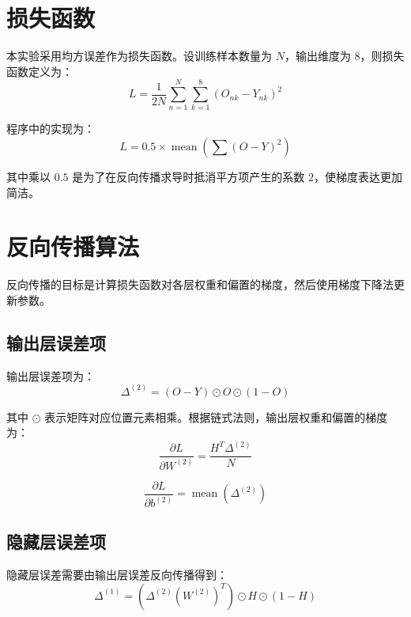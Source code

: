 \documentclass[UTF8,a4paper,12pt]{ctexart}
\begin{document}
\section{损失函数}

本实验采用均方误差作为损失函数。设训练样本数量为 $N$，输出维度为 $8$，则损失函数定义为：
\begin{equation}
    L = \frac{1}{2N}\sum_{n=1}^{N}\sum_{k=1}^{8}(O_{nk}-Y_{nk})^2
\end{equation}

程序中的实现为：
\begin{equation}
    L = 0.5 \times \operatorname{mean}\left(\sum (O-Y)^2\right)
\end{equation}

其中乘以 $0.5$ 是为了在反向传播求导时抵消平方项产生的系数 $2$，使梯度表达更加简洁。

\section{反向传播算法}

反向传播的目标是计算损失函数对各层权重和偏置的梯度，然后使用梯度下降法更新参数。

\subsection{输出层误差项}

输出层误差项为：
\begin{equation}
    \Delta^{(2)} = (O-Y) \odot O \odot (1-O)
\end{equation}

其中 $\odot$ 表示矩阵对应位置元素相乘。根据链式法则，输出层权重和偏置的梯度为：
\begin{equation}
    \frac{\partial L}{\partial W^{(2)}} =
    \frac{H^T\Delta^{(2)}}{N}
\end{equation}

\begin{equation}
    \frac{\partial L}{\partial b^{(2)}} =
    \operatorname{mean}(\Delta^{(2)})
\end{equation}

\subsection{隐藏层误差项}

隐藏层误差需要由输出层误差反向传播得到：
\begin{equation}
    \Delta^{(1)} =
    \left(\Delta^{(2)}(W^{(2)})^T\right)
    \odot H \odot (1-H)
\end{equation}
\end{document}
